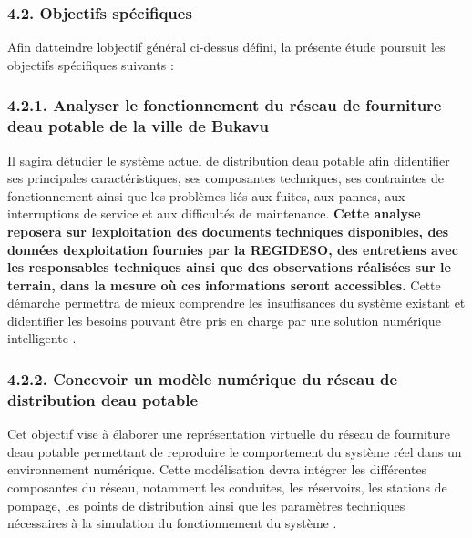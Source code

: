 \documentclass[12pt,a4paper,oneside]{report}
\begin{document}
\subsubsection{4.2. Objectifs
spécifiques}\label{objectifs-spuxe9cifiques}

Afin d\textquotesingle atteindre l\textquotesingle objectif général
ci-dessus défini, la présente étude poursuit les objectifs spécifiques
suivants :

\subsubsection{4.2.1. Analyser le fonctionnement du réseau de fourniture
d\textquotesingle eau potable de la ville de
Bukavu}\label{analyser-le-fonctionnement-du-ruxe9seau-de-fourniture-deau-potable-de-la-ville-de-bukavu}

Il s\textquotesingle agira d\textquotesingle étudier le système actuel
de distribution d\textquotesingle eau potable afin
d\textquotesingle identifier ses principales caractéristiques, ses
composantes techniques, ses contraintes de fonctionnement ainsi que les
problèmes liés aux fuites, aux pannes, aux interruptions de service et
aux difficultés de maintenance. \textbf{Cette analyse reposera sur
l\textquotesingle exploitation des documents techniques disponibles, des
données d\textquotesingle exploitation fournies par la REGIDESO, des
entretiens avec les responsables techniques ainsi que des observations
réalisées sur le terrain, dans la mesure où ces informations seront
accessibles.} Cette démarche permettra de mieux comprendre les
insuffisances du système existant et d\textquotesingle identifier les
besoins pouvant être pris en charge par une solution numérique
intelligente \cite{ref14}.

\subsubsection{4.2.2. Concevoir un modèle numérique du réseau de
distribution d\textquotesingle eau
potable}\label{concevoir-un-moduxe8le-numuxe9rique-du-ruxe9seau-de-distribution-deau-potable}

Cet objectif vise à élaborer une représentation virtuelle du réseau de
fourniture d\textquotesingle eau potable permettant de reproduire le
comportement du système réel dans un environnement numérique. Cette
modélisation devra intégrer les différentes composantes du réseau,
notamment les conduites, les réservoirs, les stations de pompage, les
points de distribution ainsi que les paramètres techniques nécessaires à
la simulation du fonctionnement du système \cite{ref8}.
\end{document}
